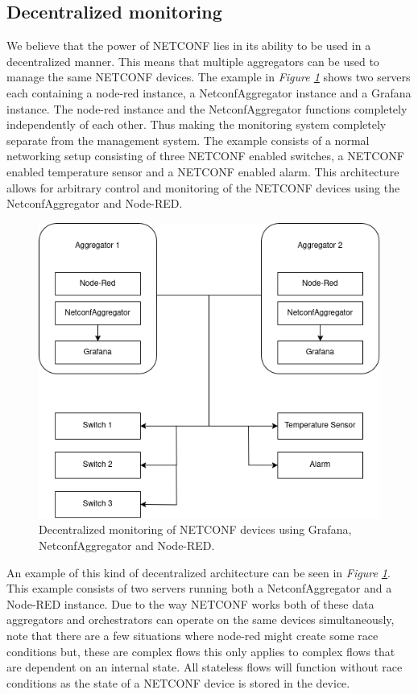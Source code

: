\documentclass[12pt]{article}
\begin{document}
\newpage

\subsection{Decentralized monitoring}
We believe that the power of NETCONF lies in its ability to be used in a decentralized manner.
This means that multiple aggregators can be used to manage the same NETCONF devices. 
The example in \textit{Figure \ref{fig:decentralized-monitoring}} shows two servers each containing a node-red instance, a NetconfAggregator 
instance and a Grafana instance. The node-red instance and the NetconfAggregator functions completely independently of each other.
Thus making the monitoring system completely separate from the management system. The example consists of a normal networking setup
consisting of three NETCONF enabled switches, a NETCONF enabled temperature sensor and a NETCONF enabled alarm.
This architecture allows for arbitrary control and monitoring of the NETCONF devices using the NetconfAggregator and Node-RED.

\newpage

\begin{figure}
  \centering
  \includegraphics[width=\textwidth]{architecture1.png}
  \caption{Decentralized monitoring of NETCONF devices using Grafana, NetconfAggregator and Node-RED.}
  \label{fig:decentralized-monitoring}
\end{figure}

An example of this kind of decentralized architecture can be seen in \textit{Figure \ref{fig:decentralized-monitoring}}.
This example consists of two servers running both a NetconfAggregator and a Node-RED instance. Due to the way NETCONF works 
both of these data aggregators and orchestrators can operate on the same devices simultaneously,
note that there are a few situations where node-red might create some race conditions but, these are complex 
flows this only applies to complex flows that are dependent on an internal state. All stateless
flows will function without race conditions as the state of a NETCONF device is stored in the device.
\end{document}
